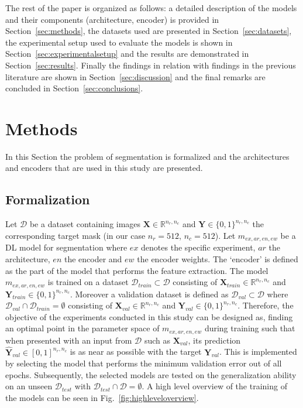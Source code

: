 \documentclass[journal]{IEEEtran}
\begin{document}
The rest of the paper is organized as follows: a detailed description of the models and their components (architecture, encoder) is provided in Section~\ref{sec:methods}, the datasets used are presented in Section~\ref{sec:datasets}, the experimental setup used to evaluate the models is shown in Section~\ref{sec:experimentalsetup} and the results are demonstrated in Section~\ref{sec:results}. Finally the findings in relation with findings in the previous literature are shown in Section~\ref{sec:discussion} and the final remarks are concluded in Section~\ref{sec:conclusions}.

\section{Methods}
In this Section the problem of segmentation is formalized and the architectures and encoders that are used in this study are presented.

\label{sec:methods}
\subsection{Formalization}
Let $\mathcal{D}$ be a dataset containing images $\bm{X} \in \mathbb{R}^{n_r, n_c}$ and $\bm{Y} \in \{0, 1\}^{n_r, n_c}$ the corresponding target mask (in our case $n_r=512$, $n_c=512$).
Let $m_{ex, ar, en, ew}$ be a DL model for segmentation where $ex$ denotes the specific experiment, $ar$ the architecture, $en$ the encoder and $ew$ the encoder weights.
The `encoder' is defined as the part of the model that performs the feature extraction.
The model $m_{ex, ar, en, ew}$ is trained on a dataset $\mathcal{D}_{train}\subset\mathcal{D}$ consisting of $\bm{X}_{train} \in \mathbb{R}^{n_r, n_c}$ and $\bm{Y}_{train} \in \{0, 1\}^{n_r, n_c}$.
Moreover a validation dataset is defined as $\mathcal{D}_{val}\subset\mathcal{D}$ where $\mathcal{D}_{val}\cap\mathcal{D}_{train}=\emptyset$ consisting of $\bm{X}_{val} \in \mathbb{R}^{n_r, n_c}$ and $\bm{Y}_{val} \in \{0, 1\}^{n_r, n_c}$.
Therefore, the objective of the experiments conducted in this study can be designed as, finding an optimal point in the parameter space of $m_{ex, ar, en, ew}$ during training such that when presented with an input from $\mathcal{D}$ such as $\bm{X}_{val}$, its prediction $\hat{\bm{Y}}_{val} \in [0, 1]^{n_r, n_c}$ is as near as possible with the target $\bm{Y}_{val}$.
This is implemented by selecting the model that performs the minimum validation error out of all epochs.
Subsequently, the selected models are tested on the generalization ability on an unseen $\mathcal{D}_{test}$ with $\mathcal{D}_{test}\cap\mathcal{D}=\emptyset$.
A high level overview of the training of the models can be seen in Fig.~\ref{fig:highleveloverview}.
\end{document}

